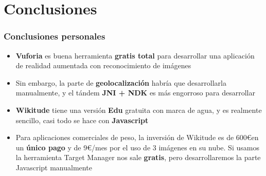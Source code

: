 \section{Conclusiones}
\frame
{
\frametitle{Conclusiones personales}
\begin{itemize}
 \item \textbf{Vuforia} es buena herramienta \textbf{gratis total} para desarrollar una aplicación de realidad aumentada con reconocimiento de imágenes
 \item Sin embargo, la parte de \textbf{geolocalización} habría que desarrollarla manualmente, y el tándem \textbf{JNI + NDK} es más engorroso para desarrollar
 \item \textbf{Wikitude} tiene una versión \textbf{Edu} gratuita con marca de agua, y es realmente sencillo, casi todo se hace con \textbf{Javascript}
 \item Para aplicaciones comerciales de peso, la inversión de Wikitude es de 600\euro \hspace{0.15cm}en un \textbf{único pago} y de 9\euro/mes por el uso de 3 imágenes en su nube. Si usamos la herramienta Target Manager nos sale \textbf{gratis}, pero desarrollaremos la parte Javascript manualmente
\end{itemize}
}
